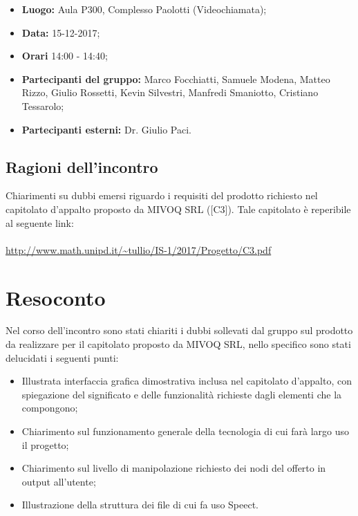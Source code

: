 \documentclass[openany,12pt,a4paper]{article}
\begin{document}
	\begin{itemize} 
	    \item \textbf{Luogo:} Aula P300, Complesso Paolotti (Videochiamata);
	    \item \textbf{Data:} 15-12-2017;
	    \item \textbf{Orari} 14:00 - 14:40;
	    \item \textbf{Partecipanti del gruppo:} Marco Focchiatti, Samuele Modena, Matteo Rizzo, Giulio Rossetti, Kevin Silvestri, Manfredi Smaniotto, Cristiano Tessarolo;
	    \item \textbf{Partecipanti esterni:} Dr. Giulio Paci.
	\end{itemize}
	
	\subsection{Ragioni dell'incontro}
	
	Chiarimenti su dubbi emersi riguardo i requisiti del prodotto richiesto nel capitolato d'appalto proposto da MIVOQ SRL ([C3]). Tale capitolato è reperibile al seguente link:
	\\ 
	\\ \url{http://www.math.unipd.it/~tullio/IS-1/2017/Progetto/C3.pdf}
	
	\section{Resoconto}
	
	Nel corso dell'incontro sono stati chiariti i dubbi sollevati dal gruppo sul prodotto da realizzare per il capitolato proposto da MIVOQ SRL, nello specifico sono stati delucidati i seguenti punti:
	
	\begin{itemize}
	    \item Illustrata interfaccia grafica dimostrativa inclusa nel capitolato d'appalto, con spiegazione del significato e delle funzionalità richieste dagli elementi che la compongono;
	    \item Chiarimento sul funzionamento generale della tecnologia  di cui farà largo uso il progetto;
	    \item Chiarimento sul livello di manipolazione richiesto dei nodi del  offerto in output all'utente;
	    \item Illustrazione della struttura dei file  di cui fa uso Speect.
	\end{itemize}
	
\end{document}
